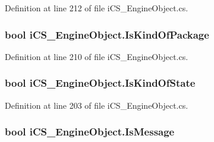 Definition at line 212 of file i\+C\+S\+\_\+\+Engine\+Object.\+cs.

\hypertarget{classi_c_s___engine_object_a7d341a3fe89b1bee22f10468e422dd08}{
\subsubsection[{Is\+Kind\+Of\+Package}]{\setlength{\rightskip}{0pt plus 5cm}bool i\+C\+S\+\_\+\+Engine\+Object.\+Is\+Kind\+Of\+Package\hspace{0.3cm}{\ttfamily [get]}}}\label{classi_c_s___engine_object_a7d341a3fe89b1bee22f10468e422dd08}


Definition at line 210 of file i\+C\+S\+\_\+\+Engine\+Object.\+cs.

\hypertarget{classi_c_s___engine_object_a705da4f3c33fa8e9315e1806a620c214}{
\subsubsection[{Is\+Kind\+Of\+State}]{\setlength{\rightskip}{0pt plus 5cm}bool i\+C\+S\+\_\+\+Engine\+Object.\+Is\+Kind\+Of\+State\hspace{0.3cm}{\ttfamily [get]}}}\label{classi_c_s___engine_object_a705da4f3c33fa8e9315e1806a620c214}


Definition at line 203 of file i\+C\+S\+\_\+\+Engine\+Object.\+cs.

\hypertarget{classi_c_s___engine_object_ac90ec713bd97f8bcad2af90645feb103}{
\subsubsection[{Is\+Message}]{\setlength{\rightskip}{0pt plus 5cm}bool i\+C\+S\+\_\+\+Engine\+Object.\+Is\+Message\hspace{0.3cm}{\ttfamily [get]}}}\label{classi_c_s___engine_object_ac90ec713bd97f8bcad2af90645feb103}


